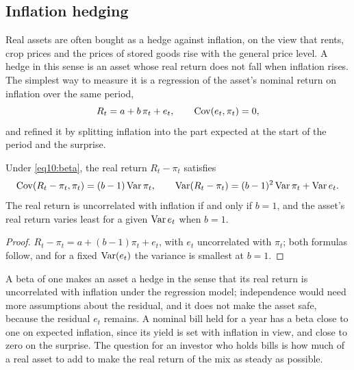 \begin{chapterrefs}
\FloatBarrier
\section{Inflation hedging}
\label{sec10:inflation}

Real assets are often bought as a hedge against inflation, on the view that rents, crop prices and the
prices of stored goods rise with the general price level. A hedge in this sense is an asset whose real
return does not fall when inflation rises. The simplest way to measure it is a regression of the asset's
nominal return on inflation over the same period,
\begin{equation}\label{eq10:beta}
  R_t = a + b\,\pi_t + e_t, \qquad \operatorname{Cov}(e_t,\pi_t)=0,
\end{equation}
and \textcite{fama1977} refined it by splitting inflation into the part expected at the start of the period
and the surprise.

\begin{proposition}\label{prop10:hedge}
Under \cref{eq10:beta}, the real return $R_t-\pi_t$ satisfies
\[
  \operatorname{Cov}(R_t-\pi_t,\pi_t)=(b-1)\operatorname{Var}\pi_t,\qquad
  \operatorname{Var}(R_t-\pi_t)=(b-1)^2\operatorname{Var}\pi_t+\operatorname{Var} e_t .
\]
The real return is uncorrelated with inflation if and only if $b=1$, and the asset's real return varies
least for a given $\operatorname{Var} e_t$ when $b=1$.
\end{proposition}

\begin{proof}
$R_t-\pi_t=a+(b-1)\pi_t+e_t$, with $e_t$ uncorrelated with $\pi_t$; both formulas follow, and for a fixed
$\operatorname{Var}(e_t)$ the variance is smallest at $b=1$.
\end{proof}

A beta of one makes an asset a hedge in the sense that its real return is uncorrelated with inflation
under the regression model; independence would need more assumptions about the residual, and it does not make the asset safe, because the residual $e_t$ remains. A nominal bill held for a year has a
beta close to one on expected inflation, since its yield is set with inflation in view, and close to zero
on the surprise. The question for an investor who holds bills is how much of a real asset to add to make
the real return of the mix as steady as possible.


\end{chapterrefs}
